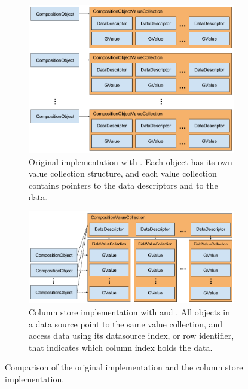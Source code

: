 \begin{figure}
    \centering
    \begin{subfigure}{1.0\textwidth}
        \includegraphics[width=\textwidth]{img/gap-original-rows.png}
        \caption{Original implementation with . Each object has its own value collection structure, and each value collection contains pointers to the data descriptors and to the data.}
        \label{fig:gap-original-rows}
    \end{subfigure}
    \begin{subfigure}{1.0\textwidth}
        \includegraphics[width=\textwidth]{img/gap-bb-columns.png}
        \caption{Column store implementation with  and . All objects in a data source point to the same value collection, and access data using its datasource index, or row identifier, that indicates which column index holds the data.}
        \label{fig:gap-bb-columns}
    \end{subfigure}
    \caption{Comparison of the original implementation and the column store implementation.}
    \label{fig:gap-storage-comparison}
\end{figure}
